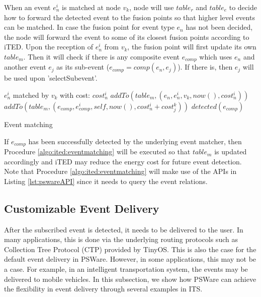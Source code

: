 When an event \(e_n^i\) is matched at node \(v_k\), node will use \(table_r\) and \(table_e\) to decide how to forward the detected event to the fusion points so that higher level events can be matched. In case the fusion point for event type \(e_n\) has not been decided, the node will forward the event to some of its closest fusion points  according to iTED. Upon the reception of \(e_n^i\) from \(v_k\), the fusion point will first update its own \(table_m\). Then it will check if there is any composite event \(e_{comp}\) which uses \(e_n\) and another event \(e_j\) as its sub-event (\(e_{comp}=comp(e_n, e_j)\)). If there is, then \(e_j\) will be used upon 'selectSubevent'.

\begin{algorithm}
\begin{algorithmic}
\REQUIRE \(e_n^i\) matched by \(v_k\) with cost: \(cost_n^i\)
	\STATE \(addTo(table_m, (e_n, e_n^i, v_k, now(), cost_n^i))\)
					\STATE \(addTo(table_m, (e_{comp}, e_{comp}^i, self, now(), cost_n^i+cost_j^k))\)
					\STATE \(detected(e_{comp})\)
				\ENDIF
			\ENDFOR
		\ENDIF
	\ENDFOR
\end{algorithmic}
\caption{Event matching}
\label{algo:ited:eventmatching}
\end{algorithm}

If \(e_{comp}\) has been successfully detected by the underlying event matcher, then Procedure \ref{algo:ited:eventmatching} will be executed so that \(table_m\) is updated accordingly and iTED may reduce the energy cost for future event detection. Note that Procedure \ref{algo:ited:eventmatching} will make use of the APIs in Listing \ref{lst:pswareAPI} since it needs to query the event relations.

\subsection{Customizable Event Delivery}
After the subscribed event is detected, it needs to be delivered to the user. In many applications, this is done via the underlying routing protocols such as Collection Tree Protocol (CTP) \cite{ctp} provided by TinyOS. This is also the case for the default event delivery in PSWare. However, in some applications, this may not be a case. For example, in an intelligent transportation system, the events may be delivered to mobile vehicles. In this subsection, we show how PSWare can achieve the flexibility in event delivery through several examples in ITS.

